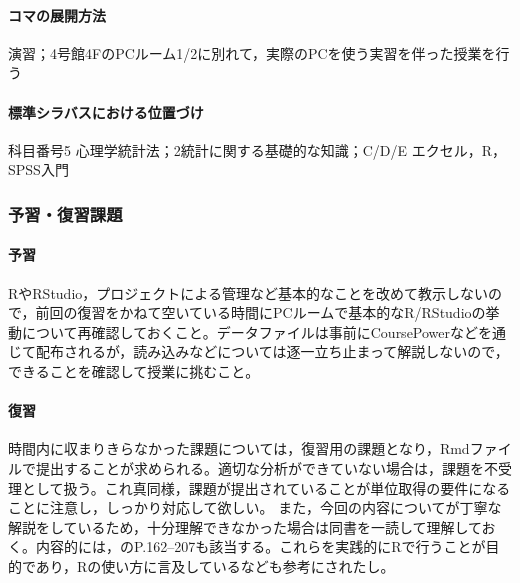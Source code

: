 \paragraph{コマの展開方法}
演習；4号館4FのPCルーム1/2に別れて，実際のPCを使う実習を伴った授業を行う
\paragraph{標準シラバスにおける位置づけ}
科目番号5 心理学統計法；2統計に関する基礎的な知識；C/D/E エクセル，R，SPSS入門
\subsubsection{予習・復習課題}
\paragraph{予習}
RやRStudio，プロジェクトによる管理など基本的なことを改めて教示しないので，前回の復習をかねて空いている時間にPCルームで基本的なR/RStudioの挙動について再確認しておくこと。データファイルは事前にCoursePowerなどを通じて配布されるが，読み込みなどについては逐一立ち止まって解説しないので，できることを確認して授業に挑むこと。
\paragraph{復習}
時間内に収まりきらなかった課題については，復習用の課題となり，Rmdファイルで提出することが求められる。適切な分析ができていない場合は，課題を不受理として扱う。これ真同様，課題が提出されていることが単位取得の要件になることに注意し，しっかり対応して欲しい。
また，今回の内容について\textcite{Hashimoto201607}が丁寧な解説をしているため，十分理解できなかった場合は同書を一読して理解しておく。内容的には，\textcite{Yamada2004}のP.162--207も該当する。これらを実践的にRで行うことが目的であり，Rの使い方に言及している\textcite{kosugi2019}なども参考にされたし。